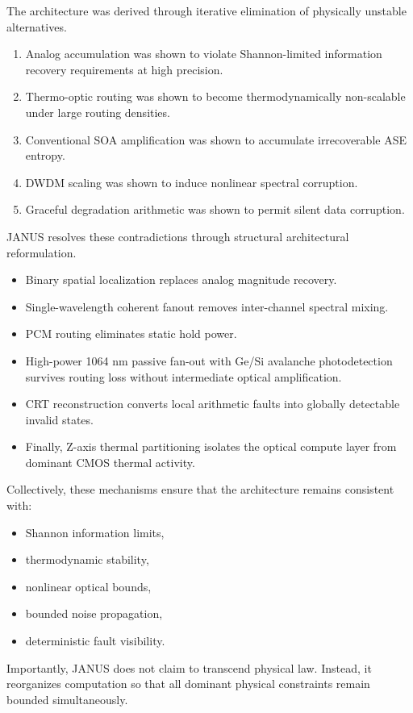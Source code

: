 \documentclass[journal]{IEEEtran}
\begin{document}
The architecture was derived through iterative elimination of physically unstable alternatives.
\begin{enumerate}
\item  Analog accumulation was shown to violate Shannon-limited information recovery requirements at high precision.
\item  Thermo-optic routing was shown to become thermodynamically non-scalable under large routing densities.
\item  Conventional SOA amplification was shown to accumulate irrecoverable ASE entropy.
\item  DWDM scaling was shown to induce nonlinear spectral corruption.
\item  Graceful degradation arithmetic was shown to permit silent data corruption.
\end{enumerate}

JANUS resolves these contradictions through structural architectural reformulation.
\begin{itemize}
\item  Binary spatial localization replaces analog magnitude recovery.
\item  Single-wavelength coherent fanout removes inter-channel spectral mixing.
\item  PCM routing eliminates static hold power.
\item  High-power 1064 nm passive fan-out with Ge/Si avalanche photodetection survives routing loss without intermediate optical amplification.
\item  CRT reconstruction converts local arithmetic faults into globally detectable invalid states.
\item  Finally, Z-axis thermal partitioning isolates the optical compute layer from dominant CMOS thermal activity.
\end{itemize}
Collectively, these mechanisms ensure that the architecture remains consistent with:
\begin{itemize}
\item  Shannon information limits,
\item  thermodynamic stability,
\item  nonlinear optical bounds,
\item bounded noise propagation,
\item  deterministic fault visibility.
\end{itemize}
Importantly, JANUS does not claim to transcend physical law. Instead, it reorganizes computation so that all dominant physical constraints remain bounded simultaneously.
\end{document}
